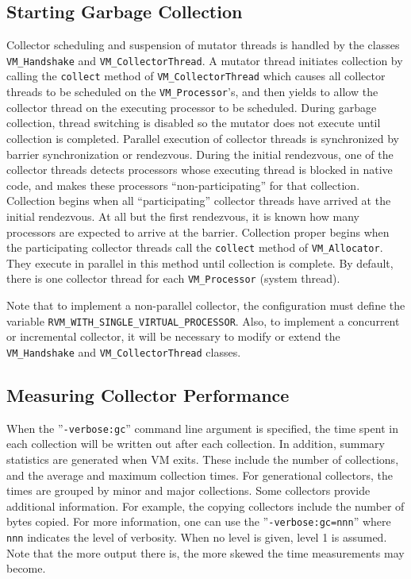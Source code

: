 \subsection{Starting Garbage Collection} \label{sssec:startgc}
Collector scheduling and suspension of mutator threads is
handled by the classes {\tt VM\_Handshake} and {\tt VM\_CollectorThread}.
A mutator thread initiates collection by calling the {\tt collect} method
of {\tt VM\_CollectorThread} which causes all collector threads to be scheduled
on the {\tt VM\_Processor}'s, and then yields to allow the collector thread
on the executing processor to be scheduled.  During garbage collection, thread
switching is disabled so the mutator does not execute until collection is completed.
Parallel execution of collector threads is synchronized by barrier synchronization or
rendezvous.  During the initial rendezvous, one of the collector threads detects
processors whose executing thread is blocked in native code, and makes
these processors ``non-participating'' for that collection.
Collection begins when all ``participating'' collector threads
have arrived at the initial rendezvous.  At all but the first rendezvous,
it is known how many processors are expected to arrive at the barrier.
Collection proper begins when the participating collector threads
call the {\tt collect} method of {\tt VM\_Allocator}.  They execute
in parallel in this method until collection is complete.  By default,
there is one collector thread for each {\tt VM\_Processor} (system thread).

Note that to implement a non-parallel collector, 
the configuration must define the variable {\tt RVM\_WITH\_SINGLE\_VIRTUAL\_PROCESSOR}.
Also, to implement a concurrent or incremental collector,
it will be necessary to modify or extend the {\tt VM\_Handshake} and {\tt VM\_CollectorThread} classes.

\subsection{Measuring Collector Performance} \label{sssec:verbosegc}
When the ''{\tt -verbose:gc}'' command line argument is specified, the time
spent in each collection will be written out after each collection.
In addition, summary statistics are generated when VM exits.  These include
the number of collections, and the average and maximum collection times.
For generational collectors, the times are grouped by minor and major collections.
Some collectors provide additional information.  For example,
the copying collectors include the number of bytes copied.
For more information, one can use the ''{\tt -verbose:gc=nnn}'' where {\tt nnn} indicates the level of 
verbosity.  When no level is given, level 1 is assumed.
Note that the more output there is, the more skewed the time measurements may become.

